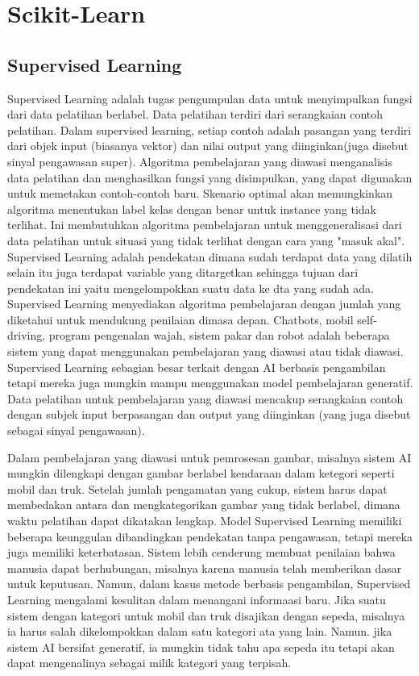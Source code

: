 \section{Scikit-Learn}
\subsection{Supervised Learning}
Supervised Learning adalah tugas pengumpulan data untuk menyimpulkan fungsi dari data pelatihan berlabel. Data pelatihan terdiri dari serangkaian contoh pelatihan. Dalam supervised learning, setiap contoh adalah pasangan yang terdiri dari objek input (biasanya vektor) dan nilai output yang diinginkan(juga disebut sinyal pengawasan super). Algoritma pembelajaran yang diawasi menganalisis data pelatihan dan menghasilkan fungsi yang disimpulkan, yang dapat digunakan untuk memetakan contoh-contoh baru. Skenario optimal akan memungkinkan algoritma menentukan label kelas dengan benar untuk instance yang tidak terlihat. Ini membutuhkan algoritma pembelajaran untuk menggeneralisasi dari data pelatihan untuk situasi yang tidak terlihat dengan cara yang "masuk akal". Supervised Learning adalah pendekatan dimana sudah terdapat data yang dilatih selain itu juga terdapat variable yang ditargetkan sehingga tujuan dari pendekatan ini yaitu mengelompokkan suatu data ke dta yang sudah ada. Supervised Learning menyediakan algoritma pembelajaran dengan jumlah yang diketahui untuk mendukung penilaian dimasa depan. Chatbots, mobil self-driving, program pengenalan wajah, sistem pakar dan robot adalah beberapa sistem yang dapat menggunakan pembelajaran yang diawasi atau tidak diawasi. Supervised Learning sebagian besar terkait dengan AI berbasis pengambilan tetapi mereka juga mungkin mampu menggunakan model pembelajaran generatif. Data pelatihan untuk pembelajaran yang diawasi mencakup serangkaian contoh dengan subjek input berpasangan dan output yang diinginkan (yang juga disebut sebagai sinyal pengawasan).

Dalam pembelajaran yang diawasi untuk pemrosesan gambar, misalnya sistem AI mungkin dilengkapi dengan gambar berlabel kendaraan dalam ketegori seperti mobil dan truk. Setelah jumlah pengamatan yang cukup, sistem harus dapat membedakan antara dan mengkategorikan gambar yang tidak berlabel, dimana waktu pelatihan dapat dikatakan lengkap. Model Supervised Learning memiliki beberapa keunggulan dibandingkan pendekatan tanpa pengawasan, tetapi mereka juga memiliki keterbatasan. Sistem lebih cenderung membuat penilaian bahwa manusia dapat berhubungan, misalnya karena manusia telah memberikan dasar untuk keputusan. Namun, dalam kasus metode berbasis pengambilan, Supervised Learning mengalami kesulitan dalam menangani informaasi baru. Jika suatu sistem dengan kategori untuk mobil dan truk disajikan dengan sepeda, misalnya ia harus salah dikelompokkan dalam satu kategori ata yang lain. Namun. jika sistem AI bersifat generatif, ia mungkin tidak tahu apa sepeda itu tetapi akan dapat mengenalinya sebagai milik kategori yang terpisah.

